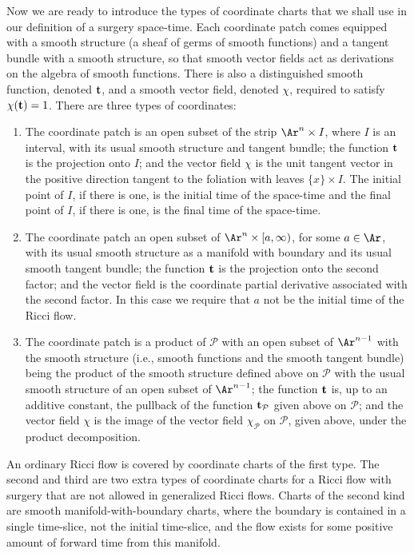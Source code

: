 Now we are ready to introduce the types of coordinate charts that we
shall use in our definition of a surgery space-time. Each coordinate
patch comes equipped with a smooth structure (a sheaf of germs of
smooth functions) and a tangent bundle with a smooth structure, so
that smooth vector fields act as derivations on the algebra of
smooth functions. There is also a distinguished smooth function,
denoted ${\bf t}$, and a smooth vector field, denoted $\chi$,
required to satisfy $\chi({\bf t})=1$. There are three types of
coordinates:
\begin{enumerate}
\item[(1)] The coordinate patch is an open subset of the strip ${\Ar}^{n}\times I$,
where $I$ is an interval, with its usual smooth structure and
tangent bundle; the function ${\bf t}$ is the projection onto $I$;
and the vector field $\chi$ is the unit tangent vector in the
positive direction tangent to the foliation with leaves $\{x\}\times
I$. The initial point of $I$, if there is one, is the initial time
of the space-time and the final point of $I$, if there is one, is
the final time of the space-time.
\item[(2)] The coordinate patch an open subset of $\Ar^n\times [a,\infty)$, for some $a\in \Ar$,
 with its
usual smooth structure as a manifold with boundary and its usual
smooth tangent bundle; the function ${\bf t}$ is the projection onto
the second factor; and the vector field is the coordinate partial
derivative associated with the second factor. In this case we
require that $a$ not be the initial time of the Ricci flow.
\item[(3)] The coordinate patch is a product of ${\mathcal P}$ with an open subset of
$\Ar^{n-1}$ with the smooth structure (i.e., smooth functions and
the smooth tangent bundle) being the product of the smooth structure
defined above on ${\mathcal P}$ with the usual smooth structure of
an open subset of $\Ar^{n-1}$; the function ${\bf t}$ is, up to an
additive constant, the pullback of the function ${\bf t}_{\mathcal
P}$ given above on ${\mathcal P}$; and the vector field $\chi$ is
the image of the vector field $\chi_{\mathcal P}$ on ${\mathcal P}$,
given above, under the product decomposition.
\end{enumerate}

An ordinary Ricci flow is covered by coordinate charts of the first
type.  The second and third are two extra types of coordinate charts
for a Ricci flow with surgery that are not allowed in generalized
Ricci flows. Charts of the second kind are smooth
manifold-with-boundary charts, where the boundary is contained in a
single time-slice,  not the initial time-slice, and the flow exists
for some positive amount of forward time from this manifold.


